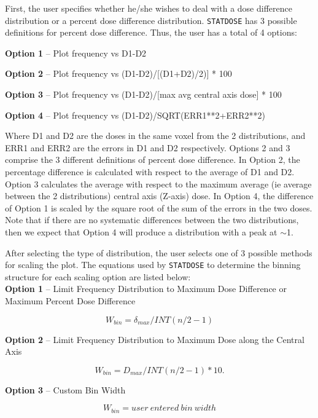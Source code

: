 \documentclass[12pt,twoside]{article}
\begin{document}
First, the user specifies whether he/she wishes to deal with a dose difference
distribution or a percent
dose difference distribution.
\verb+STATDOSE+ has 3 possible definitions for percent
dose difference.  Thus, the user has a total of 4 options:

{\bf Option 1} -- Plot frequency vs D1-D2

{\bf Option 2} -- Plot frequency vs (D1-D2)/[(D1+D2)/2)] * 100%

{\bf Option 3} -- Plot frequency vs (D1-D2)/[max avg central axis dose] * 100%

{\bf Option 4} -- Plot frequency vs (D1-D2)/SQRT(ERR1**2+ERR2**2)

Where D1 and D2 are the doses in the same voxel from the 2 distributions,
and ERR1 and ERR2 are the errors in D1 and D2 respectively.  Options 2 and 3
comprise the 3 different definitions of percent dose difference.  In Option 2,
the percentage difference is calculated with respect to the average of
D1 and D2.  Option 3 calculates the average with respect to the maximum
average (ie average between the 2 distributions) central axis (Z-axis) dose.
In Option 4, the difference
of Option 1 is scaled by the square root of the sum of the errors in the
two doses.  Note that if there are no systematic differences between
the two distributions, then we expect that Option 4 will produce a distribution
with a peak at $\sim$1.

After selecting the type of distribution, the user selects one of 3 possible
methods for scaling the plot.  The
equations used by \verb+STATDOSE+ to determine the binning structure for
each scaling option are listed below:\\

{\bf Option 1} -- Limit Frequency Distribution to Maximum Dose Difference or
Maximum Percent Dose Difference

\begin{equation}
W_{bin}= \delta_{max}/INT(n/2-1) \label{eq:option1}
\end{equation}

{\bf Option 2} -- Limit Frequency Distribution to Maximum Dose along the Central Axis

\begin{equation}
W_{bin}= D_{max}/INT(n/2-1)*10. \label{eq:option2}
\end{equation}

{\bf Option 3} -- Custom Bin Width

\begin{equation}
W_{bin}= user\ entered\ bin\ width \label{eq:option3}
\end{equation}
\end{document}
